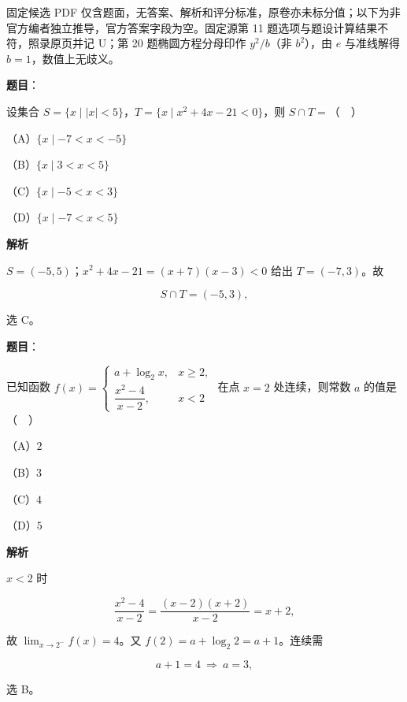 

\begin{gktip}
固定候选 PDF 仅含题面，无答案、解析和评分标准，原卷亦未标分值；以下为非官方编者独立推导，官方答案字段为空。固定源第 11 题选项与题设计算结果不符，照录原页并记 U；第 20 题椭圆方程分母印作 $y^2/b$（非 $b^2$），由 $e$ 与准线解得 $b=1$，数值上无歧义。
\end{gktip}

\begin{answer}

\textbf{题目}：

设集合 $S=\{x\mid |x|<5\}$，$T=\{x\mid x^2+4x-21<0\}$，则 $S\cap T=$（　）

（A）$\{x\mid -7<x<-5\}$

（B）$\{x\mid 3<x<5\}$

（C）$\{x\mid -5<x<3\}$

（D）$\{x\mid -7<x<5\}$

\textbf{解析}

$S=(-5,5)$；$x^2+4x-21=(x+7)(x-3)<0$ 给出 $T=(-7,3)$。故

\nopagebreak[4]
\[S\cap T=(-5,3),\]

选 C。


\end{answer}
\begin{answer}

\textbf{题目}：

已知函数 $f(x)=\begin{cases}a+\log_2x,&x\geqslant2,\\[4pt] \dfrac{x^2-4}{x-2},&x<2\end{cases}$ 在点 $x=2$ 处连续，则常数 $a$ 的值是（　）

（A）$2$

（B）$3$

（C）$4$

（D）$5$

\textbf{解析}

$x<2$ 时

\nopagebreak[4]
\[\frac{x^2-4}{x-2}=\frac{(x-2)(x+2)}{x-2}=x+2,\]

故 $\lim_{x\to2^-}f(x)=4$。又 $f(2)=a+\log_2 2=a+1$。连续需

\nopagebreak[4]
\[a+1=4\ \Longrightarrow\ a=3,\]

选 B。


\end{answer}
